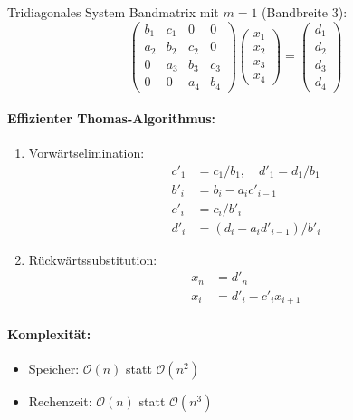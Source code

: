 \begin{example2}{Tridiagonales System}
Bandmatrix mit $m=1$ (Bandbreite 3):
$$\begin{pmatrix}
b_1 & c_1 & 0 & 0 \\
a_2 & b_2 & c_2 & 0 \\
0 & a_3 & b_3 & c_3 \\
0 & 0 & a_4 & b_4
\end{pmatrix}
\begin{pmatrix}
x_1 \\ x_2 \\ x_3 \\ x_4
\end{pmatrix} = 
\begin{pmatrix}
d_1 \\ d_2 \\ d_3 \\ d_4
\end{pmatrix}$$

\paragraph{Effizienter Thomas-Algorithmus:}
\begin{enumerate}
    \item Vorwärtselimination:
    \begin{align*}
        c'_1 &= c_1/b_1, \quad d'_1 = d_1/b_1 \\
        b'_i &= b_i - a_ic'_{i-1} \\
        c'_i &= c_i/b'_i \\
        d'_i &= (d_i - a_id'_{i-1})/b'_i
    \end{align*}
    
    \item Rückwärtssubstitution:
    \begin{align*}
        x_n &= d'_n \\
        x_i &= d'_i - c'_ix_{i+1}
    \end{align*}
\end{enumerate}

\paragraph{Komplexität:}
\begin{itemize}
    \item Speicher: $\mathcal{O}(n)$ statt $\mathcal{O}(n^2)$
    \item Rechenzeit: $\mathcal{O}(n)$ statt $\mathcal{O}(n^3)$
\end{itemize}
\end{example2}












